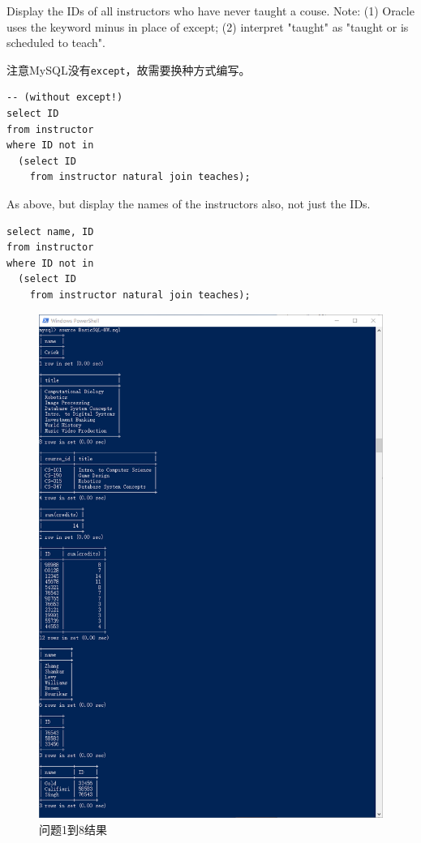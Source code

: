 \documentclass[logo,reportComp]{thesis}
\begin{document}
\begin{question}
\normalfont 
Display the IDs of all instructors who have never taught a couse. Note: (1) Oracle uses the keyword minus in place of except; (2) interpret "taught" as "taught or is scheduled to teach".
\end{question}
\begin{answer}注意MySQL没有\verb'except'，故需要换种方式编写。
\begin{lstlisting}
-- (without except!)
select ID
from instructor
where ID not in
  (select ID
    from instructor natural join teaches);
\end{lstlisting}
\end{answer}

\begin{question}
\normalfont 
As above, but display the names of the instructors also, not just the IDs.
\end{question}
\begin{answer}\mbox{}\par
\begin{lstlisting}
select name, ID
from instructor
where ID not in
  (select ID
    from instructor natural join teaches);
\end{lstlisting}
\end{answer}

\begin{figure}[H]
\centering
\includegraphics[width=\linewidth]{fig/Q1-8.png}
\caption{问题1到8结果}
\end{figure}
\end{document}
